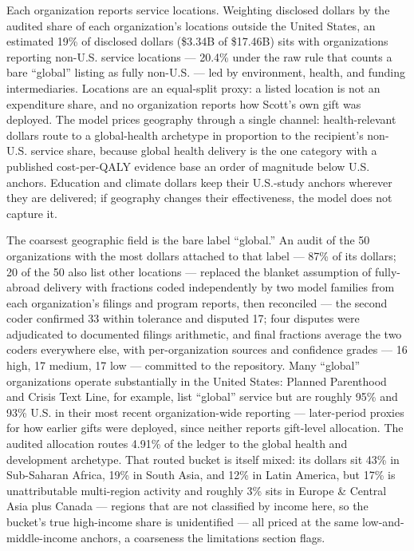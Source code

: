 \documentclass[
  11pt,
  letterpaper,
  DIV=11,
  numbers=noendperiod]{scrartcl}
\begin{document}
Each organization reports service locations. Weighting disclosed dollars
by the audited share of each organization's locations outside the United
States, an estimated 19\% of disclosed dollars (\$3.34B of \$17.46B)
sits with organizations reporting non-U.S. service locations --- 20.4\%
under the raw rule that counts a bare ``global'' listing as fully
non-U.S. --- led by environment, health, and funding intermediaries.
Locations are an equal-split proxy: a listed location is not an
expenditure share, and no organization reports how Scott's own gift was
deployed. The model prices geography through a single channel:
health-relevant dollars route to a global-health archetype in proportion
to the recipient's non-U.S. service share, because global health
delivery is the one category with a published cost-per-QALY evidence
base an order of magnitude below U.S. anchors. Education and climate
dollars keep their U.S.-study anchors wherever they are delivered; if
geography changes their effectiveness, the model does not capture it.

The coarsest geographic field is the bare label ``global.'' An audit of
the 50 organizations with the most dollars attached to that label ---
87\% of its dollars; 20 of the 50 also list other locations --- replaced
the blanket assumption of fully-abroad delivery with fractions coded
independently by two model families from each organization's filings and
program reports, then reconciled --- the second coder confirmed 33
within tolerance and disputed 17; four disputes were adjudicated to
documented filings arithmetic, and final fractions average the two
coders everywhere else, with per-organization sources and confidence
grades --- 16 high, 17 medium, 17 low --- committed to the repository.
Many ``global'' organizations operate substantially in the United
States: Planned Parenthood and Crisis Text Line, for example, list
``global'' service but are roughly 95\% and 93\% U.S. in their most
recent organization-wide reporting --- later-period proxies for how
earlier gifts were deployed, since neither reports gift-level
allocation. The audited allocation routes 4.91\% of the ledger to the
global health and development archetype. That routed bucket is itself
mixed: its dollars sit 43\% in Sub-Saharan Africa, 19\% in South Asia,
and 12\% in Latin America, but 17\% is unattributable multi-region
activity and roughly 3\% sits in Europe \& Central Asia plus Canada ---
regions that are not classified by income here, so the bucket's true
high-income share is unidentified --- all priced at the same
low-and-middle-income anchors, a coarseness the limitations section
flags.
\end{document}
